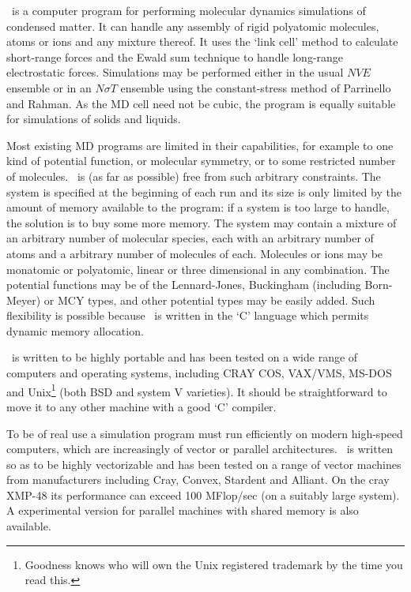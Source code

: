 \moldy\  is a computer program for performing molecular dynamics
simulations of condensed matter.  It can handle any assembly of rigid
polyatomic molecules, atoms or ions and any mixture thereof. It uses
the `link cell' method to calculate short-range forces and the Ewald
sum technique to handle long-range electrostatic forces.  Simulations
may be performed either in the usual $NVE$ ensemble or in an $N\sigma
T$ ensemble using the constant-stress method of Parrinello and Rahman.
As the MD cell need not be cubic, the program is equally suitable for
simulations of solids and liquids.

Most existing MD programs are limited in their capabilities, for
example to one kind of potential function, or molecular symmetry, or
to some restricted number of molecules.  \moldy\  is (as far as
possible) free from such arbitrary constraints.  The system is
specified at the beginning of each run and its size is only limited by
the amount of memory available to the program: if a system is too
large to handle, the solution is to buy some more memory.  The system
may contain a mixture of an arbitrary number of molecular species,
each with an arbitrary number of atoms and a arbitrary number of
molecules of each. Molecules or ions may be monatomic or polyatomic,
linear or three dimensional in any combination.  The potential
functions may be of the Lennard-Jones, Buckingham (including
Born-Meyer) or MCY types, and other potential types may be easily
added.  Such flexibility is possible because \moldy\  is written in the
`C' language which permits dynamic memory allocation.

\moldy\  is written to be highly portable and has been tested on a wide
range of computers and operating systems, including CRAY COS, VAX/VMS,
MS-DOS and Unix\footnote{Goodness knows who will own the Unix
registered trademark by the time you read this.}  (both BSD and system V
varieties).  It should be straightforward to move it to any other
machine with a good `C' compiler.

To be of real use a simulation  program must run efficiently on modern
high-speed computers, which  are  increasingly of vector   or parallel
architectures.  \moldy\  is written so  as to be highly vectorizable and
has been  tested on a   range of  vector machines  from  manufacturers
including Cray, Convex, Stardent and  Alliant.  On the cray XMP-48 its
performance can exceed 100 MFlop/sec (on a suitably large  system).  A
experimental version for parallel  machines with shared memory is also
available.

